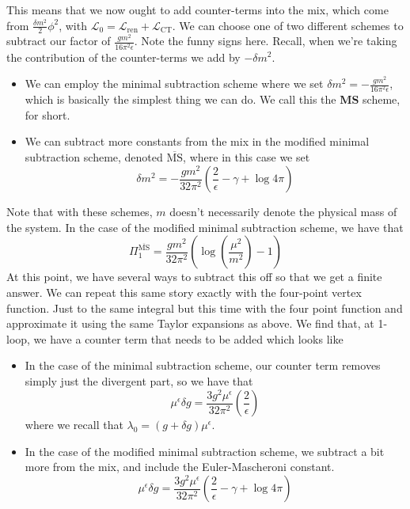 \documentclass[11pt, oneside]{article}   	%
\theoremstyle{slanted}
\begin{document}
This means that we now ought to add counter-terms 
into the mix, which come from  $ \frac{\delta m ^ 2 }{ 2 } \phi ^ 2  $, 
with  $ \mathcal{ L } _ 0  = \mathcal{ L }_{\text{ren}} + \mathcal{ L }_{\text{CT}} $. 
We can choose one of two different schemes 
to subtract our factor of $ \frac{gm ^ 2  }{ 16 \pi ^ 2 \epsilon } $. 
Note the funny signs here. Recall, when 
we're taking the contribution of the counter-terms 
we add by $ - \delta m ^ 2 $. 
\begin{itemize}
\item We can employ the minimal subtraction scheme 
	where we set $ \delta m ^ 2  = -\frac{gm ^ 2 }{ 16 \pi ^ 2 \epsilon } $, 
	which is basically the simplest thing we can do. We 
	call this the \textbf{MS} scheme, for short. 
\item We can subtract more constants from the mix in the 
	modified minimal subtraction scheme, 
	denoted $\overline{\text{MS}}$, where in this case we
	set
	\[
	 \delta m ^ 2  = 
	 - \frac{gm ^2 }{32 \pi ^ 2 }\left( \frac{2}{\epsilon } 
	  - \gamma + \log 4 \pi \right)  
	\] 
\end{itemize}
Note that with these schemes, $ m $ doesn't
necessarily denote the physical mass 
of the system. 
In the case of the modified minimal subtraction scheme, 
we have that 
\[
\Pi _ 1 ^{\overline{\text{MS}}} = \frac{gm ^ 2 }{32 \pi ^ 2  }
\left( \log \left( \frac{\mu ^ 2 }{m ^ 2  }  \right) - 1 \right) 
\] 
At this point, we have 
several ways to subtract this off 
so that we get a finite answer. We can repeat this 
same story exactly with the four-point vertex function. 
Just to the same integral but this 
time with the four point function and 
approximate it using the same Taylor expansions 
as above. 
We find that, at 1-loop, 
we have a counter term that needs to 
be added which looks like
\begin{itemize}
\item In the case of the minimal subtraction scheme, 
	our counter term removes simply just 
	the divergent part, so we have 
	that 
	\[
\mu ^{ \epsilon } \delta g 
= \frac{3 g ^ 2 \mu ^{ \epsilon } }{ 32 \pi ^ 2 } 
\left( \frac{2}{\epsilon }  \right) 
\] where we recall that $ \lambda _ 0 = \left( g + \delta g  \right)  
\mu  ^{ \epsilon } $. 
\item In the case of the modified minimal subtraction 
	scheme, we 
	subtract a bit more 
	from the mix, and include the 
	Euler-Mascheroni constant. 
	\[
	 \mu ^{ \epsilon } \delta g  = \frac{3 g ^ 2 \mu ^{ \epsilon } }{ 32 \pi ^ 2 } 
\left( \frac{2}{\epsilon }  - \gamma + \log 4 \pi  \right) 
	\]  
\end{itemize}
\end{document}
